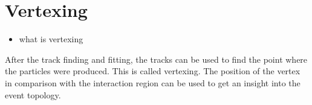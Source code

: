 \section{Vertexing}

\begin{itemize}
    \color{red}
    \item what is vertexing
\end{itemize}

After the track finding and fitting, the tracks can be used to find the point where the particles were produced. This is called vertexing. The position of the vertex in comparison with the interaction region can be used to get an insight into the event topology.
